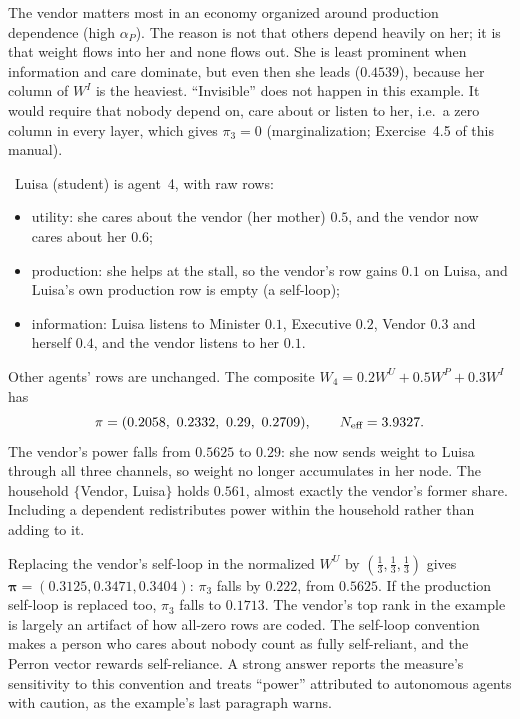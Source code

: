 \documentclass[../solutions_manual.tex]{subfiles}
\begin{document}
 The vendor matters most in an economy organized around production dependence (high $\alpha_P$). The reason is not that others depend heavily on her; it is that weight flows into her and none flows out. She is least prominent when information and care dominate, but even then she leads ($0.4539$), because her column of $W^I$ is the heaviest. ``Invisible'' does not happen in this example. It would require that nobody depend on, care about or listen to her, i.e.\ a zero column in every layer, which gives $\pi_3 = 0$ (marginalization; Exercise~4.5 of this manual).

 \illustrative\ Luisa (student) is agent~4, with raw rows:
\begin{itemize}
\item utility: she cares about the vendor (her mother) $0.5$, and the vendor now cares about her $0.6$;
\item production: she helps at the stall, so the vendor's row gains $0.1$ on Luisa, and Luisa's own production row is empty (a self-loop);
\item information: Luisa listens to Minister $0.1$, Executive $0.2$, Vendor $0.3$ and herself $0.4$, and the vendor listens to her $0.1$.
\end{itemize}
Other agents' rows are unchanged. The composite $W_4 = 0.2W^U + 0.5W^P + 0.3W^I$ has
\[
\boldsymbol\pi = (0.2058,\ 0.2332,\ 0.29,\ 0.2709), \qquad \Neff = 3.9327 .
\]
The vendor's power falls from $0.5625$ to $0.29$: she now sends weight to Luisa through all three channels, so weight no longer accumulates in her node. The household $\{$Vendor, Luisa$\}$ holds $0.561$, almost exactly the vendor's former share. Including a dependent redistributes power within the household rather than adding to it.

 Replacing the vendor's self-loop in the normalized $W^U$ by $(\frac13, \frac13, \frac13)$ gives $\boldsymbol\pi = (0.3125, 0.3471, 0.3404)$: $\pi_3$ falls by $0.222$, from $0.5625$. If the production self-loop is replaced too, $\pi_3$ falls to $0.1713$. The vendor's top rank in the example is largely an artifact of how all-zero rows are coded. The self-loop convention makes a person who cares about nobody count as fully self-reliant, and the Perron vector rewards self-reliance. A strong answer reports the measure's sensitivity to this convention and treats ``power'' attributed to autonomous agents with caution, as the example's last paragraph warns.

\end{document}
